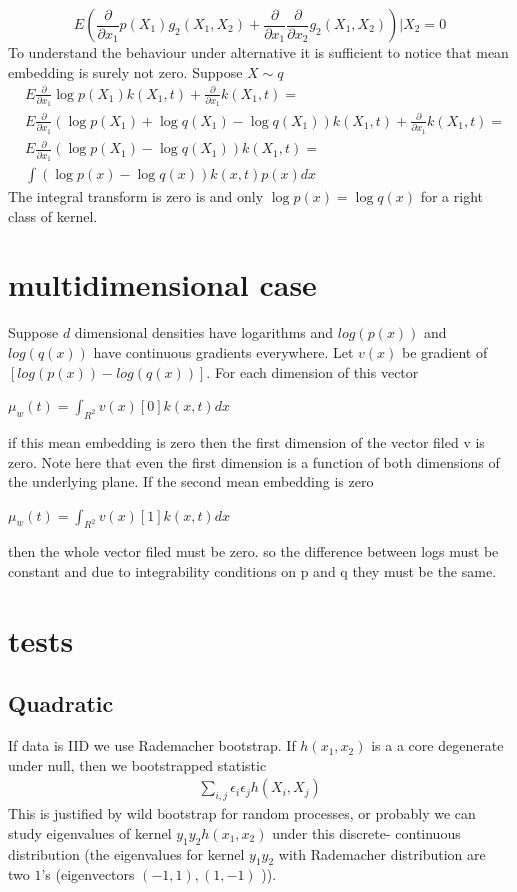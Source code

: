 \documentclass{article}
\begin{document}
$$
E \left ( \frac{\partial } {\partial x_1} p(X_1) g_2(X_1,X_2) 
+  \frac{\partial } {\partial x_1}\frac{\partial } {\partial x_2} g_2(X_1,X_2) \right )| X_2 = 0
$$
To understand the behaviour under alternative it is sufficient to notice that mean embedding is surely not zero. Suppose $X \sim q$
\begin{align}
 &E \frac{\partial } {\partial x_1} \log p(X_1) k(X_1,t) + \frac{\partial } {\partial x_1} k(X_1,t) =\\
 &E  \frac{\partial } {\partial x_1} ( \log  p(X_1) + \log  q(X_1)- \log  q(X_1)  )  k(X_1,t)   + \frac{\partial } {\partial x_1} k(X_1,t) = \\
 &E  \frac{\partial } {\partial x_1} (\log p(X_1) - \log q(X_1))k(X_1,t)   = \\
 & \int  (\log p(x) - \log q(x) ) k(x,t) p(x) dx
\end{align}
The integral transform is zero is and only $\log p(x) = \log q(x)$ for a right class of kernel.

\section{multidimensional case}
Suppose $d$ dimensional densities have logarithms and  $log(p(x))$ and $log(q(x))$ have continuous  gradients everywhere. 
Let $v(x)$ be gradient of  $[ log(p(x)) - log(q(x)) ]$. For each dimension of this vector  

$\mu_w(t) = \int_{R^2}  v(x)[0] k(x,t) dx$
 
if this mean embedding is zero then the first dimension of the vector filed v is zero. Note here that even the first dimension is a function of both dimensions of the underlying plane. If the second  mean embedding is zero

$\mu_w(t) = \int_{R^2}  v(x)[1] k(x,t) dx$

then the whole vector filed must be zero. so the difference between logs must be constant and due to integrability conditions on p and q they must be the same.

\section{tests}

\subsection{Quadratic}
If data is IID we use Rademacher bootstrap. If $h(x_1,x_2)$ is a a core degenerate under null, then we bootstrapped statistic
\begin{align}
 \sum_{i,j} \epsilon_i \epsilon_j h(X_i,X_j)
\end{align}
This is justified by wild bootstrap for random processes, or probably we can study eigenvalues of kernel $y_1  y_2 h(x_1,x_2)$ under this discrete- continuous distribution  (the eigenvalues for kernel $y_1  y_2$ with Rademacher distribution are two $1$'s (eigenvectors $(-1,1),(1,-1)$ )).       
\end{document}
